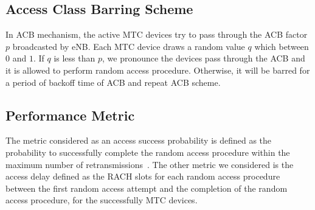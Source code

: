     \subsection{Access Class Barring Scheme}
    In ACB mechanism, the active MTC devices try to pass through the ACB factor $p$ broadcasted by eNB. Each MTC device draws a random value $q$ which between $0$ and $1$. If $q$ is less than $p$, we pronounce the devices pass through the ACB and it is allowed to perform random access procedure. Otherwise, it will be barred for a period of backoff time of ACB and repeat ACB scheme.

    \subsection{Performance Metric}
    The metric considered as an access success probability is defined as the probability to successfully complete the random access procedure within the maximum number of retransmissions~\cite{3GPP37.868}. The other metric we considered is the access delay defined as the RACH slots for each random access procedure between the first random access attempt and the completion of the random access procedure, for the successfully MTC devices.
